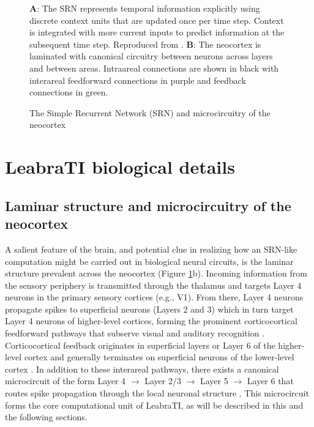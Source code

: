 \documentclass[dwyatte_dissertation.tex]{subfiles}
\begin{document}
\begin{figure}[hp]
\begin{tabular}{ll}
\end{tabular}
\caption{The Simple Recurrent Network (SRN) and microcircuitry of the neocortex}{\textbf{A}: The SRN represents temporal information explicitly using discrete context units that are updated once per time step. Context is integrated with more current inputs to predict information at the subsequent time step. Reproduced from \protect{}. \textbf{B}: The neocortex is laminated with canonical circuitry between neurons across layers and between areas. Intraareal connections are shown in black with interareal feedforward connections in purple and feedback connections in green.}
\label{fig:srn_circuit}
\end{figure}

\section{LeabraTI biological details}
\subsection{Laminar structure and microcircuitry of the neocortex}

A salient feature of the brain, and potential clue in realizing how an SRN-like computation might be carried out in biological neural circuits, is the laminar structure prevalent across the neocortex (Figure \ref{fig:srn_circuit}b). Incoming information from the sensory periphery is transmitted through the thalamus and targets Layer 4 neurons in the primary sensory cortices (e.g., V1). From there, Layer 4 neurons propagate spikes to superficial neurons (Layers 2 and 3) which in turn target Layer 4 neurons of higher-level cortices, forming the prominent corticocortical feedforward pathways that subserve visual and auditory recognition \cite{FellemanVanEssen91}. Corticocortical feedback originates in superficial layers or Layer 6 of the higher-level cortex and generally terminates on superficial neurons of the lower-level cortex \cite{RocklandPandya79}. In addition to these interareal pathways, there exists a canonical microcircuit of the form Layer 4 $\rightarrow$ Layer 2/3 $\rightarrow$ Layer 5 $\rightarrow$ Layer 6 that routes spike propagation through the local neuronal structure \cite{DouglasMartin04,ThomsonLamy07}. This microcircuit forms the core computational unit of LeabraTI, as will be described in this and the following sections.
\end{document}
